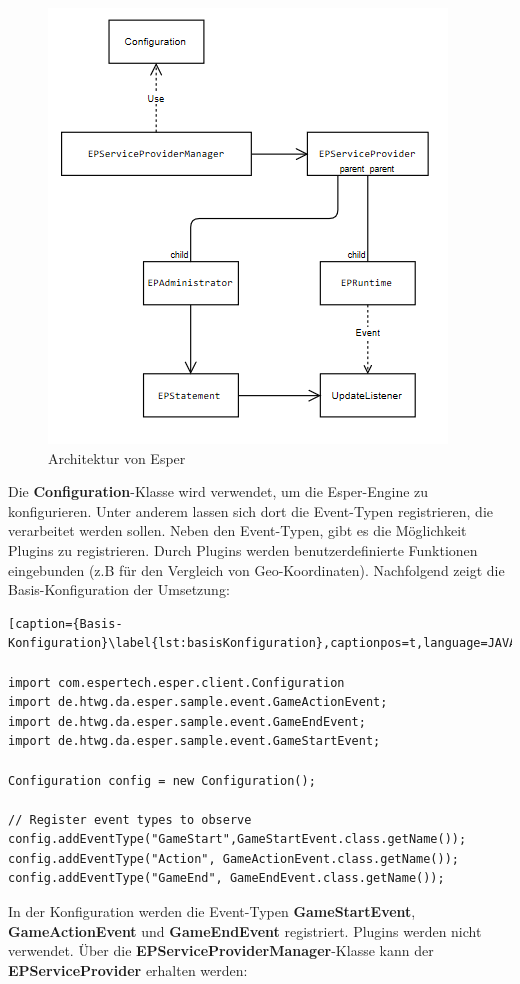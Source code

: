 \begin{figure}[ht]
	\centering
	\includegraphics{images/Architektur.png}
	\caption{Architektur von Esper}
	\label{architektur}
\end{figure}

Die \textbf{Configuration}-Klasse wird verwendet, um die Esper-Engine zu konfigurieren. Unter anderem lassen sich dort die Event-Typen registrieren, die verarbeitet werden sollen. Neben den Event-Typen, gibt es die Möglichkeit Plugins zu registrieren. 
\absatz
Durch Plugins werden benutzerdefinierte Funktionen eingebunden (z.B für den Vergleich von Geo-Koordinaten).
Nachfolgend zeigt die Basis-Konfiguration der Umsetzung:

\begin{lstlisting}[caption={Basis-Konfiguration}\label{lst:basisKonfiguration},captionpos=t,language=JAVA]

import com.espertech.esper.client.Configuration
import de.htwg.da.esper.sample.event.GameActionEvent;
import de.htwg.da.esper.sample.event.GameEndEvent;
import de.htwg.da.esper.sample.event.GameStartEvent;

Configuration config = new Configuration();

// Register event types to observe
config.addEventType("GameStart",GameStartEvent.class.getName());
config.addEventType("Action", GameActionEvent.class.getName());
config.addEventType("GameEnd", GameEndEvent.class.getName());

\end{lstlisting}
In der Konfiguration werden die Event-Typen \textbf{GameStartEvent}, \textbf{GameActionEvent} und \textbf{GameEndEvent} registriert. Plugins werden nicht verwendet.
Über die \textbf{EPServiceProviderManager}-Klasse kann der \textbf{EPServiceProvider} erhalten werden:

